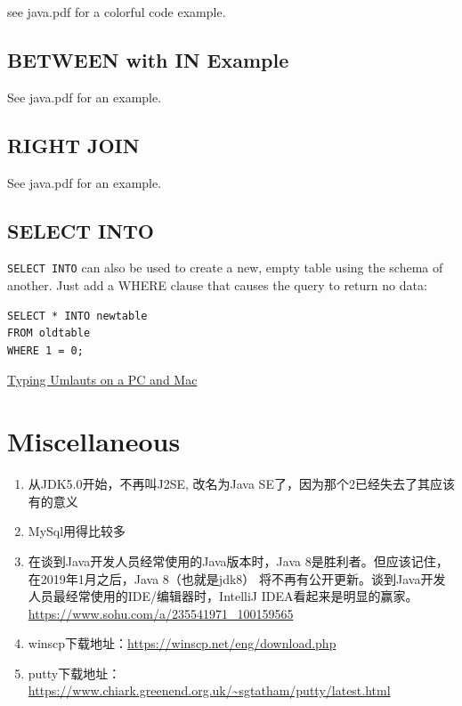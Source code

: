 \documentclass[a4paper, 12pt]{article}
\begin{document}
see java.pdf for a colorful code example.

\subsection{BETWEEN with IN Example}
See java.pdf for an example.

\subsection{RIGHT JOIN}
See java.pdf for an example.

\subsection{SELECT INTO}
\verb|SELECT INTO| can also be used to create a new, empty table using the schema of another. Just add a WHERE clause that causes the query to return no data:
\begin{verbatim}
SELECT * INTO newtable
FROM oldtable
WHERE 1 = 0;
\end{verbatim}



\href{http://www.nthuleen.com/teach/misc/typingumlauts.html}{Typing Umlauts on a PC and Mac}


\section{Miscellaneous}

\begin{enumerate}
\item 从JDK5.0开始，不再叫J2SE, 改名为Java SE了，因为那个2已经失去了其应该有的意义

\item MySql用得比较多

\item 在谈到Java开发人员经常使用的Java版本时，Java 8是胜利者。但应该记住，在2019年1月之后，Java 8（也就是jdk8） 将不再有公开更新。谈到Java开发人员最经常使用的IDE/编辑器时，IntelliJ IDEA看起来是明显的赢家。 \url{https://www.sohu.com/a/235541971_100159565}

\item winscp下载地址：\url{https://winscp.net/eng/download.php}

\item putty下载地址：\url{https://www.chiark.greenend.org.uk/~sgtatham/putty/latest.html}

\end{enumerate}
\end{document}
